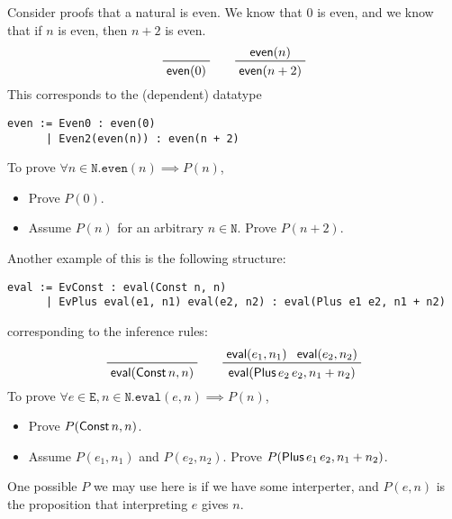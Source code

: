 \documentclass[class=scrartcl]{standalone}
\begin{document}
Consider proofs that a natural is even.
We know that \(0\) is even, and
we know that if \(n\) is even, then \(n+2\) is even.
\[
  \prfaxiom{\lcalcname{even}(0)}
  \qquad
  \prftree{\lcalcname{even}(n)}
          {\lcalcname{even}(n + 2)}
\]
This corresponds to the (dependent) datatype
\begin{verbatim}
even := Even0 : even(0)
      | Even2(even(n)) : even(n + 2)
\end{verbatim}
To prove \(\forall n \in \texttt{N}. \texttt{even}(n) \implies P(n)\),
\begin{itemize}[nosep]
  \item Prove \(P(0)\).
  \item Assume \(P(n)\) for an arbitrary \(n \in \texttt{N}\).
        Prove \(P(n + 2)\).
\end{itemize}

Another example of this is the following structure:
\begin{verbatim}
eval := EvConst : eval(Const n, n)
      | EvPlus eval(e1, n1) eval(e2, n2) : eval(Plus e1 e2, n1 + n2)
\end{verbatim}
corresponding to the inference rules:
\[
  \prfaxiom{\lcalcname{eval}(\lcalcname{Const} n, n)}
  \qquad
  \prftree{\lcalcname{eval}(e_1, n_1)}
          {\lcalcname{eval}(e_2, n_2)}
          {\lcalcname{eval}(\lcalcname{Plus} e_2\, e_2, n_1 + n_2)}
\]
To prove \(\forall e \in \texttt{E}, n \in \texttt{N}.
           \texttt{eval}(e, n) \implies P(n)\),
\begin{itemize}[nosep]
  \item Prove \(P(\operatorname{\textsf{Const}} n, n)\).
  \item Assume \(P(e_1, n_1)\) and \(P(e_2, n_2)\).
        Prove \(P(\operatorname{\textsf{Plus}} e_1\, e_2, n_1 + n_2)\).
\end{itemize}
One possible \(P\) we may use here is if we have some interperter,
and \(P(e, n)\) is the proposition that interpreting \(e\) gives \(n\).
\end{document}
